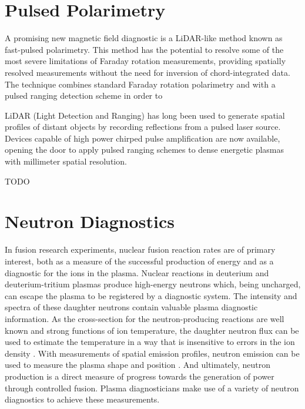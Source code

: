 \documentclass{jpp}
\begin{document}
\section{Pulsed Polarimetry}

A promising new magnetic field diagnostic is a LiDAR-like method known as fast-pulsed polarimetry. This method has the potential to resolve some of the most severe limitations of Faraday rotation measurements, providing spatially resolved measurements without the need for inversion of chord-integrated data. The technique combines standard Faraday rotation polarimetry \citep{Pisarczyk1990} and  with a pulsed ranging detection scheme in order to 

LiDAR (Light Detection and Ranging) has long been used to generate spatial profiles of distant objects by recording reflections from a pulsed laser source. Devices capable of high power chirped pulse amplification \citep{STRICKLAND1985219} are now available, opening the door to apply pulsed ranging schemes to dense energetic plasmas with millimeter spatial resolution.

{\Large TODO \par}

\section{Neutron Diagnostics}

In fusion research experiments, nuclear fusion reaction rates are of primary interest, both as a measure of the successful production of energy and as a diagnostic for the ions in the plasma. Nuclear reactions in deuterium and deuterium-tritium plasmas produce high-energy neutrons which, being uncharged, can escape the plasma to be registered by a diagnostic system. The intensity and spectra of these daughter neutrons contain valuable plasma diagnostic information. As the cross-section for the neutron-producing reactions are well known and strong functions of ion temperature, the daughter neutron flux can be used to estimate the temperature in a way that is insensitive to errors in the ion density \citep[p. 371]{Hutchinson_2002}. With measurements of spatial emission profiles, neutron emission can be used to measure the plasma shape and position \citep{Bielecki2019}. And ultimately, neutron production is a direct measure of progress towards the generation of power through controlled fusion. Plasma diagnosticians make use of a variety of neutron diagnostics to achieve these measurements.
\end{document}
